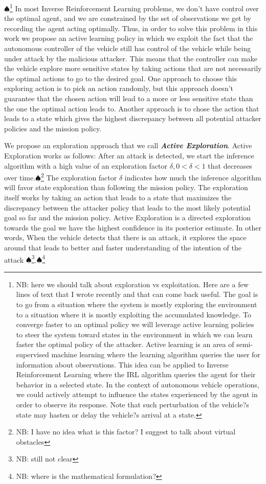 \documentclass[letterpaper, 10 pt, conference]{ieeeconf}  %
\newcommand\NB[1]{$\spadesuit$\footnote{NB: #1}}
\begin{document}
\NB{here we should talk about exploration vs exploitation. Here are a few lines of text that I wrote recently and that can come back useful. The goal is to go from a situation where the system is mostly exploring the environment to a situation where it is mostly exploiting the accumulated knowledge. To converge faster to an optimal policy we will leverage active learning policies to steer the system toward states in the environment in which we can learn faster the optimal policy of the attacker. Active learning is an area of semi-supervised machine learning where the learning algorithm queries the user for information about observations. This idea can be applied to Inverse Reinforcement Learning where the IRL algorithm queries the agent for their behavior in a selected state. In the context of autonomous vehicle operations, we could actively attempt to influence the states experienced by the agent in order to observe its response. Note that such perturbation of the vehicle?s state may hasten or delay the vehicle?s arrival at a state.} In most Inverse Reinforcement Learning problems, we don't have control over the optimal agent, and we are constrained by the set of observations we get by recording the agent acting optimally. Thus, in order to solve this problem in this work we propose an active learning policy in which we exploit the fact that the autonomous controller of the vehicle still has control of the vehicle while being under attack by the malicious attacker. This means that the controller can make the vehicle explore more sensitive states by taking actions that are not necessarily the optimal actions to go to the desired goal. One approach to choose this exploring action is to pick an action randomly, but this approach doesn't guarantee that the chosen action will lead to a more or less sensitive state than the one the optimal action leads to. Another approach is to chose the action that leads to a state which gives the highest discrepancy between all potential attacker policies and the mission policy.

We propose an exploration approach that we call \textbf{\textit{Active Exploration}}. Active Exploration works as follows: After an attack is detected, we start the inference algorithm with a high value of an exploration factor $\delta, 0 < \delta < 1$ that decreases over time.\NB{I have no idea what is this factor? I suggest to talk about virtual obstacles} The exploration factor $\delta$ indicates how much the inference algorithm will favor state exploration than following the mission policy. The exploration itself works by taking an action that leads to a state that maximizes the discrepancy between the attacker policy that leads to the most likely potential goal so far and the mission policy. Active Exploration is a directed exploration towards the goal we have the highest confidence in its posterior estimate. In other words, When the vehicle detects that there is an attack, it explores the space around that leads to better and faster understanding of the intention of the attack \NB{still not clear}.\NB{where is the mathematical formulation?}
\end{document}
